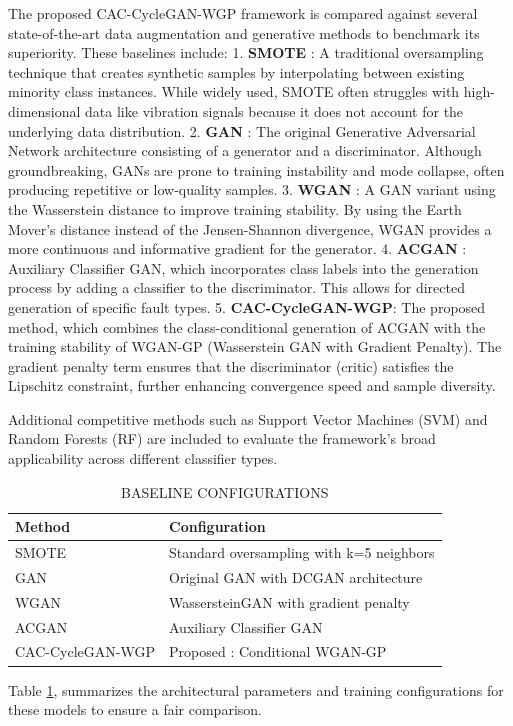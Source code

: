 \documentclass[twocolumn]{IEEEtran}
\begin{document}
The proposed CAC-CycleGAN-WGP framework is compared against several state-of-the-art data augmentation and generative methods to benchmark its superiority. These baselines include:
1. \textbf{SMOTE} \cite{6}: A traditional oversampling technique that creates synthetic samples by interpolating between existing minority class instances. While widely used, SMOTE often struggles with high-dimensional data like vibration signals because it does not account for the underlying data distribution.
2. \textbf{GAN} \cite{1}: The original Generative Adversarial Network architecture consisting of a generator and a discriminator. Although groundbreaking, GANs are prone to training instability and mode collapse, often producing repetitive or low-quality samples.
3. \textbf{WGAN} \cite{2}: A GAN variant using the Wasserstein distance to improve training stability. By using the Earth Mover's distance instead of the Jensen-Shannon divergence, WGAN provides a more continuous and informative gradient for the generator.
4. \textbf{ACGAN} \cite{5}: Auxiliary Classifier GAN, which incorporates class labels into the generation process by adding a classifier to the discriminator. This allows for directed generation of specific fault types.
5. \textbf{CAC-CycleGAN-WGP}: The proposed method, which combines the class-conditional generation of ACGAN with the training stability of WGAN-GP (Wasserstein GAN with Gradient Penalty). The gradient penalty term ensures that the discriminator (critic) satisfies the Lipschitz constraint, further enhancing convergence speed and sample diversity.

Additional competitive methods such as Support Vector Machines (SVM) \cite{Cortes1995} and Random Forests (RF) \cite{Breiman2001} are included to evaluate the framework's broad applicability across different classifier types. \begin{table}[htbp]
\centering
\caption{BASELINE CONFIGURATIONS}
\label{tab:baselines}
\begin{tabular}{ll}
\hline
Method & Configuration \\
\hline
SMOTE & Standard oversampling with k=5 neighbors \\
GAN & Original GAN with DCGAN architecture \\
WGAN & WassersteinGAN with gradient penalty \\
ACGAN & Auxiliary Classifier GAN \\
CAC-CycleGAN-WGP & Proposed : Conditional WGAN-GP \\
\hline
\end{tabular}
\end{table} Table \ref{tab:baselines}, summarizes the architectural parameters and training configurations for these models to ensure a fair comparison. 
\end{document}
